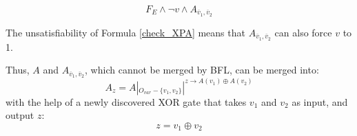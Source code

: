 \documentclass[journal]{IEEEtran}
\begin{document}
\begin{equation}\label{check_XPA}
F_E\wedge \neg v\wedge A_{\overline{v}_1,\overline{v}_2}
\end{equation}

%
%
%
%
%
%
%

The unsatisfiability of Formula \ref{check_XPA} means that $A_{\overline{v}_1,\overline{v}_2}$
can also force $v$ to 1.

Thus,
$A$ and $A_{\overline{v}_1,\overline{v}_2}$,
which cannot be merged by BFL,
can be merged into:
\begin{equation}\label{mergeA}
A_z= A|_{O_{var}-\{v_1,v_2\}}|^{z\to A(v_1)\oplus A(v_2)}
\end{equation}
with the help of a newly discovered XOR gate that takes $v_1$ and $v_2$ as input,
and output $z$:
\begin{equation}
z=v_1\oplus v_2
\end{equation}
\end{document}

